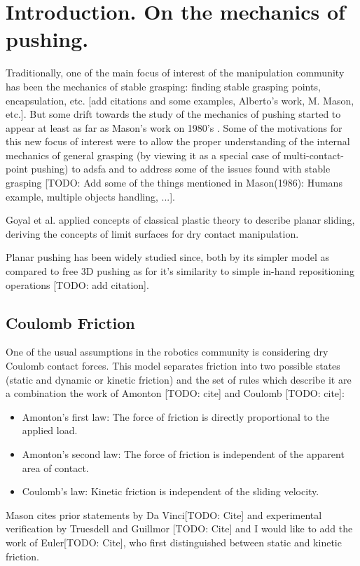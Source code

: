 \documentclass[12,twoside]{TFG-GM}
\theoremstyle{definition}
\theoremstyle{remark}
\begin{document}
\maketitle

\section{Introduction. On the mechanics of pushing.}
\label{sec:intro}

Traditionally, one of the main focus of interest of the manipulation community has been the mechanics of stable grasping: finding stable grasping points, encapsulation, etc. [add citations and some examples, Alberto's work, M. Mason, etc.]. But some drift towards the study of the mechanics of pushing started to appear at least as far as Mason's work on 1980's \cite{pushing4}. Some of the motivations for this new focus of interest were to allow the proper understanding of the internal mechanics of general grasping (by viewing it as a special case of multi-contact-point pushing) to {adsfa} and to address some of the issues found with stable grasping [TODO: Add some of the things mentioned in Mason(1986): Humans example, multiple objects handling, ...].

Goyal et al. \cite{planar_sliding1}\cite{planar_sliding2} applied concepts of classical plastic theory to describe planar sliding, deriving the concepts of limit surfaces for dry contact manipulation.

Planar pushing has been widely studied since, both by its simpler model as compared to free 3D pushing as for it's similarity to simple in-hand repositioning operations [TODO: add citation].


\subsection{Coulomb Friction}
\label{subsec:coulomb}
One of the usual assumptions in the robotics community is considering dry Coulomb contact forces. This model separates friction into two possible states (static and dynamic or kinetic friction) and the set of rules which describe it are a combination the work of Amonton [TODO: cite] and Coulomb [TODO: cite]:
\begin{itemize}
\item{Amonton's first law:} The force of friction is directly proportional to the applied load.
\item{Amonton's second law:} The force of friction is independent of the apparent area of contact.
\item{Coulomb's law:} Kinetic friction is independent of the sliding velocity.
\end{itemize}
Mason cites prior statements by Da Vinci[TODO: Cite] and experimental verification by Truesdell and Guillmor [TODO: Cite] and I would like to add the work of Euler[TODO: Cite], who first distinguished between static and kinetic friction.
\end{document}
